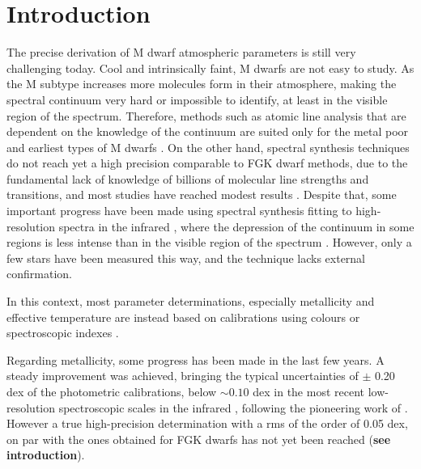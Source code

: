 \documentclass{aa}
\begin{document}

   \maketitle


\section{Introduction}

The precise derivation of M dwarf atmospheric parameters is still very challenging today. Cool and intrinsically faint, M dwarfs are not easy to study. As the M subtype increases more molecules form in their atmosphere, making the spectral continuum very hard or impossible to identify, at least in the visible region of the spectrum. Therefore, methods such as atomic line analysis that are dependent on the knowledge of the continuum are suited only for the metal poor and earliest types of M dwarfs \citep[e.g.][]{Woolf-2005,Woolf-2006}. On the other hand, spectral synthesis techniques do not reach yet a high precision comparable to FGK dwarf methods, due to the fundamental lack of knowledge of billions of molecular line strengths and transitions, and most studies have reached modest results \citep[e.g.][]{Valenti-1998,Bean-2006a}. Despite that, some important progress have been made using spectral synthesis fitting to high-resolution spectra in the infrared \citep{Onehag-2012}, where the depression of the continuum in some regions is less intense than in the visible region of the spectrum \citep[e.g.][]{Rajpurohit-2013b}. However, only a few stars have been measured this way, and the technique lacks external confirmation. 

In this context, most parameter determinations, especially metallicity and effective temperature are instead based on calibrations using colours \citep[e.g.][]{Bonfils-2005,Johnson-2009,Schlaufman-2010,Johnson-2012,Neves-2012} or spectroscopic indexes \citep[e.g.][]{Rojas-Ayala-2010,Rojas-Ayala-2012, Mann-2013a,Mann-2013b,Newton-2013}.

Regarding metallicity, some progress has been made in the last few years. A steady improvement was achieved, bringing the typical uncertainties of $\pm$ 0.20 dex of the photometric calibrations, below $\sim 0.10$ dex in the most recent low-resolution spectroscopic scales in the infrared \cite[e.g.][]{Rojas-Ayala-2012,Mann-2013a,Newton-2013}, following the pioneering work of \citet{Rojas-Ayala-2010}. However a true high-precision determination with a rms of the order of 0.05 dex, on par with the ones obtained for FGK dwarfs \citep[e.g.][]{Santos-2004b,Sousa-2007} has not yet been reached (\textbf{see \citet{Neves-2012} introduction}).
 
\end{document}
